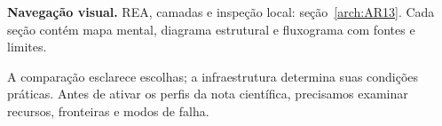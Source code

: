 
\begin{descricao}\textbf{Navegação visual.} REA, camadas e inspeção local: seção~\ref{arch:AR13}. Cada seção contém mapa mental, diagrama estrutural e fluxograma com fontes e limites.\end{descricao}


A comparação esclarece escolhas; a infraestrutura determina suas condições práticas. Antes de ativar os perfis da nota científica, precisamos examinar recursos, fronteiras e modos de falha.
